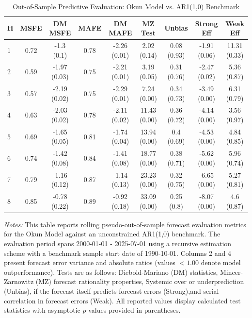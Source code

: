 \begin{table}[htbp]
\centering
\caption{Out-of-Sample Predictive Evaluation: Okun Model vs. AR1(1,0) Benchmark}
\label{tab:okun_model_evaluation}
\footnotesize
\begin{tabular}{l cccccccc}
\hline\hline
\rule{0pt}{3ex}
\textbf{H} & \textbf{MSFE} & \textbf{DM MSFE} & \textbf{MAFE} & \textbf{DM MAFE} & \textbf{MZ Test} & \textbf{Unbias} & \textbf{Strong Eff} & \textbf{Weak Eff} \\[0.5ex]
\hline
\rule{0pt}{2.5ex}
1 & 0.72 & -1.3 (0.1) & 0.78 & -2.26 (0.01) & 2.02 (0.14) & 0.08 (0.93) & -1.91 (0.06) & 11.31 (0.33) \\
2 & 0.59 & -1.97 (0.03) & 0.75 & -2.21 (0.01) & 3.19 (0.05) & 0.31 (0.76) & -2.47 (0.02) & 5.36 (0.87) \\
3 & 0.57 & -2.19 (0.02) & 0.75 & -2.29 (0.01) & 7.24 (0.00) & 0.34 (0.73) & -3.49 (0.00) & 6.31 (0.79) \\
4 & 0.63 & -2.03 (0.02) & 0.78 & -2.11 (0.02) & 11.43 (0.00) & 0.36 (0.72) & -4.14 (0.00) & 3.56 (0.97) \\
5 & 0.69 & -1.65 (0.05) & 0.81 & -1.74 (0.04) & 13.94 (0.00) & 0.4 (0.69) & -4.53 (0.00) & 4.84 (0.85) \\
6 & 0.74 & -1.42 (0.08) & 0.84 & -1.41 (0.08) & 18.77 (0.00) & 0.38 (0.71) & -5.62 (0.00) & 5.96 (0.74) \\
7 & 0.79 & -1.16 (0.12) & 0.87 & -1.14 (0.13) & 23.23 (0.00) & 0.32 (0.75) & -6.65 (0.00) & 5.27 (0.81) \\
8 & 0.85 & -0.78 (0.22) & 0.89 & -0.92 (0.18) & 33.09 (0.00) & 0.25 (0.8) & -8.07 (0.00) & 4.6 (0.87) \\
\hline\hline
\end{tabular}%
\par\smallskip
\parbox{\textwidth}{\scriptsize \textit{Notes:} This table reports rolling pseudo-out-of-sample forecast evaluation metrics for the Okun Model against an unconstrained AR1(1,0) benchmark. The evaluation period spans 2000-01-01 - 2025-07-01 using a recursive estimation scheme with a benchmark sample start date of 1990-10-01. Columns 2 and 4 present forecast error variance and absolute ratios (values $< 1.00$ denote model outperformance). Tests are as follows: Diebold-Mariano (DM) statistics, Mincer-Zarnowitz (MZ) forecast rationality properties, Systemic over or underprediction (Unbias), if the forecast itself predicts forecast errors (Strong),and serial correlation in forecast errors (Weak). All reported values display calculated test statistics with asymptotic $p$-values provided in parentheses.}
\end{table}
